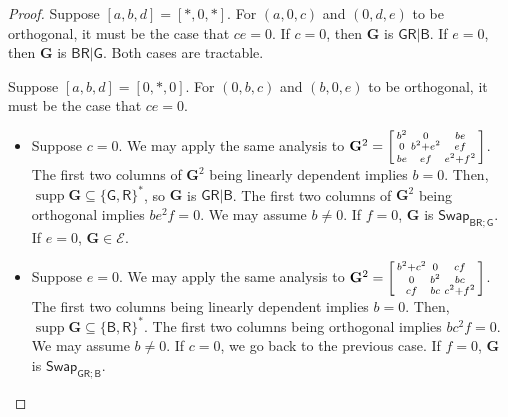 \documentclass[11pt]{article}
\DeclareMathOperator{\supp}{supp}
\newcommand{\db}{\mathsf{B}}
\newcommand{\dg}{\mathsf{G}}
\newcommand{\dr}{\mathsf{R}}
\newcommand{\swhelper}[1]{$\mathsf{Swap}_{#1}$\xspace}
\newcommand{\swbr}{\swhelper{\db \dr; \dg}}
\newcommand{\swgr}{\swhelper{\dg \dr; \db}}
\newcommand{\bdgr}{\dg \dr | \db}
\begin{document}
\begin{proof}
  Suppose $[a, b, d] = [*, 0, *]$. 
For $(a, 0, c)$ and $(0, d, e)$ to be orthogonal, it must be the case that $ce = 0$.
  If $c = 0$, then $\mathbf{G}$ is $\bdgr$.
  If $e = 0$, then $\mathbf{G}$ is $\db \dr | \dg$.
  Both cases are tractable.

  Suppose $[a, b, d] = [0, *, 0]$.
For $(0, b, c)$ and $(b, 0, e)$ to be orthogonal, it must be the case that $ce = 0$.
  \begin{itemize}
    \item 
      Suppose $c = 0$.
      We may apply the same analysis to $\mathbf{G}^2 = \begin{bsmallmatrix}
        b^2 & 0 & be \\
        0 & b^2 + e^2 & ef \\
        be & ef & e^2 + f^2
      \end{bsmallmatrix}$.
      The first two columns of $\mathbf{G}^2$ being linearly dependent implies $b = 0$. Then, $\supp \mathbf{G} \subseteq \{\dg, \dr\}^*$, so $\mathbf{G}$ is $\bdgr$.
      The first two columns of $\mathbf{G}^2$ being orthogonal implies $b e^2 f = 0$. 
      We may assume $b \ne 0$.
      If $f = 0$, $\mathbf{G}$ is \swbr.
      If $e = 0$, $\mathbf{G} \in \mathcal{E}$.
    \item
      Suppose $e = 0$.
      We may apply the same analysis to $\mathbf{G}^2 = \begin{bsmallmatrix}
        b^2 + c^2 & 0 & cf \\
        0 & b^2 & bc \\
        cf & bc & c^2 + f^2
      \end{bsmallmatrix}$.
      The first two columns being linearly dependent implies $b = 0$. Then, $\supp \mathbf{G} \subseteq \{\db, \dr\}^*$.
      The first two columns being orthogonal implies $b c^2 f = 0$.
      We may assume $b \ne 0$.
      If $c = 0$, we go back to the previous case.
      If $f = 0$, $\mathbf{G}$ is \swgr.
  \end{itemize}


\end{proof}
\end{document}

